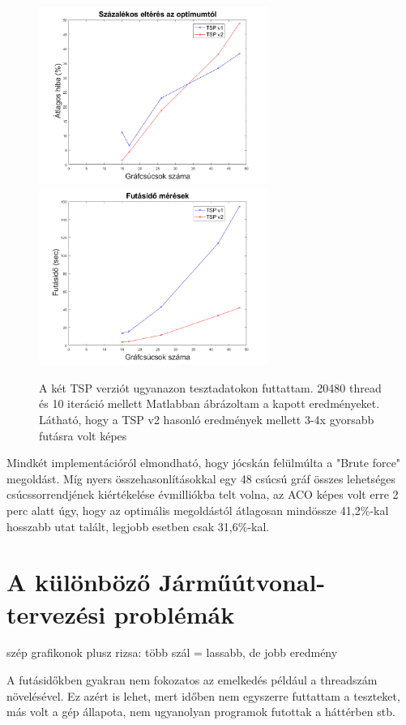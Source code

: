 \begin{figure}[ht!]
	\includegraphics[width=75mm, keepaspectratio]{figures/TSP-benchmark-error.png}
	\includegraphics[width=75mm, keepaspectratio]{figures/TSP-benchmark-time.png}
	\caption{A két TSP verziót ugyanazon tesztadatokon futtattam. 20480 thread és 10 iteráció mellett Matlabban ábrázoltam a kapott eredményeket. Látható, hogy a TSP v2 hasonló eredmények mellett 3-4x gyorsabb futásra volt képes}
	\label{fig:TSP-benchmark}
\end{figure}

Mindkét implementációról elmondható, hogy jócskán felülmúlta a "Brute force" megoldást. Míg nyers összehasonlításokkal egy 48 csúcsú gráf összes lehetséges csúcssorrendjének kiértékelése évmilliókba telt volna, az ACO képes volt erre 2 perc alatt úgy, hogy az optimális megoldástól átlagosan mindössze 41,2\%-kal hosszabb utat talált, legjobb esetben csak 31,6\%-kal.
  

\section{A különböző Járműútvonal-tervezési problémák}
szép grafikonok plusz rizsa: több szál = lassabb, de jobb eredmény

A futásidőkben gyakran nem fokozatos az emelkedés például a threadszám növelésével. Ez azért is lehet, mert időben nem egyszerre futtattam a teszteket, más volt a gép állapota, nem ugyanolyan programok futottak a háttérben stb.


